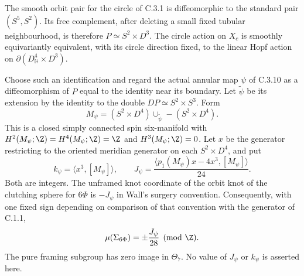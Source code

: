 \begin{proposition}
The smooth orbit pair for the circle of C.3.1 is diffeomorphic to
the standard pair $(S^5,S^2)$. Its free complement, after deleting
a small fixed tubular neighbourhood, is therefore
$P\simeq S^2\times D^3$. The circle action on $X_c$ is smoothly
equivariantly equivalent, with its circle direction fixed, to the
linear Hopf action on
$\partial(D^4_{\mathbb H}\times D^3)$.

Choose such an identification and regard the actual annular map
$\psi$ of C.3.10 as a diffeomorphism of $P$ equal to the identity
near its boundary. Let $\widetilde\psi$ be its extension by the
identity to the double $DP\simeq S^2\times S^3$. Form
\[
 M_\psi=(S^2\times D^4)\cup_{\widetilde\psi}
                  -(S^2\times D^4).
\]
This is a closed simply connected spin six-manifold with
$H^2(M_\psi;\Z)=H^4(M_\psi;\Z)=\Z$ and $H^3(M_\psi;\Z)=0$.
Let $x$ be the generator restricting to the oriented meridian
generator on each $S^2\times D^4$, and put
\[
 k_\psi=\langle x^3,[M_\psi]\rangle,\qquad
 J_\psi=\frac{\langle p_1(M_\psi)x-4x^3,[M_\psi]\rangle}{24}.
\]
Both are integers. The unframed knot coordinate of the orbit
knot of the clutching sphere for $6\Phi$ is $-J_\psi$ in
Wall's surgery convention. Consequently, with one fixed sign
depending on comparison of that convention with the generator
of C.1.1,
\[
 \mu(\Sigma_{6\Phi})=\pm\frac{J_\psi}{28}\pmod\Z.
\]
The pure framing subgroup has zero image in $\Theta_7$.
No value of $J_\psi$ or $k_\psi$ is asserted here.
\end{proposition}
